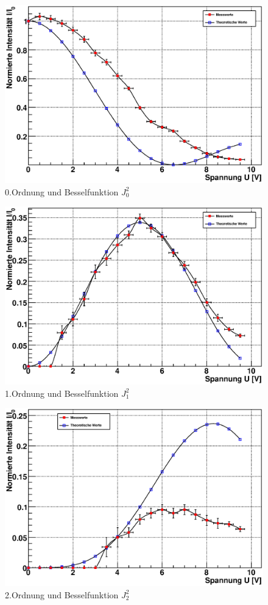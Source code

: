\documentclass[12pt]{article}
\begin{document}
\begin{figure}[H]  
\centering
\includegraphics[width=0.9\linewidth]{pictures/raman0o.eps}
\caption{0.Ordnung und Besselfunktion $J^2_0$}
\end{figure}

\begin{figure}[H]  
\centering
\includegraphics[width=0.9\linewidth]{pictures/raman1o.eps}
\caption{1.Ordnung und Besselfunktion $J^2_1$}
\end{figure}

\begin{figure}[H]  
\centering
\includegraphics[width=0.9\linewidth]{pictures/raman2o.eps}
\caption{2.Ordnung und Besselfunktion $J^2_2$}
\end{figure}
\end{document}
